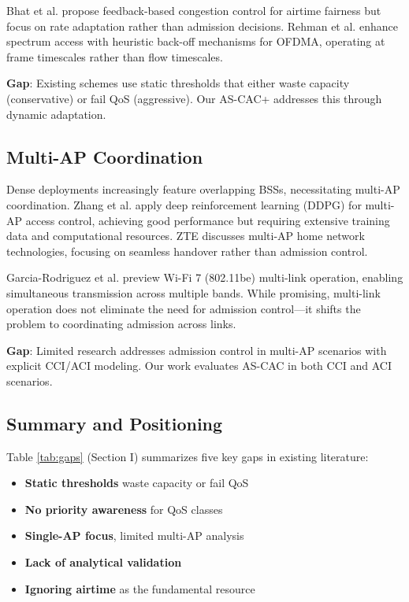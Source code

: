 \documentclass[conference]{IEEEtran}
\begin{document}
Bhat et al. \cite{16} propose feedback-based congestion control for airtime fairness but focus on rate adaptation rather than admission decisions. Rehman et al. \cite{15} enhance spectrum access with heuristic back-off mechanisms for OFDMA, operating at frame timescales rather than flow timescales.

\textbf{Gap}: Existing schemes use static thresholds that either waste capacity (conservative) or fail QoS (aggressive). Our AS-CAC+ addresses this through dynamic adaptation.

\subsection{Multi-AP Coordination}

Dense deployments increasingly feature overlapping BSSs, necessitating multi-AP coordination. Zhang et al. \cite{18} apply deep reinforcement learning (DDPG) for multi-AP access control, achieving good performance but requiring extensive training data and computational resources. ZTE \cite{19} discusses multi-AP home network technologies, focusing on seamless handover rather than admission control.

Garcia-Rodriguez et al. \cite{5} preview Wi-Fi 7 (802.11be) multi-link operation, enabling simultaneous transmission across multiple bands. While promising, multi-link operation does not eliminate the need for admission control—it shifts the problem to coordinating admission across links.

\textbf{Gap}: Limited research addresses admission control in multi-AP scenarios with explicit CCI/ACI modeling. Our work evaluates AS-CAC in both CCI and ACI scenarios.

\subsection{Summary and Positioning}

Table \ref{tab:gaps} (Section I) summarizes five key gaps in existing literature:
\begin{itemize}
    \item \textbf{Static thresholds} waste capacity or fail QoS
    \item \textbf{No priority awareness} for QoS classes
    \item \textbf{Single-AP focus}, limited multi-AP analysis
    \item \textbf{Lack of analytical validation}
    \item \textbf{Ignoring airtime} as the fundamental resource
\end{itemize}
\end{document}
